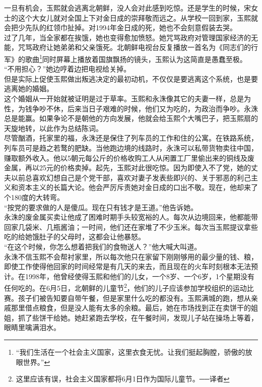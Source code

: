 \ifnum{}
	\begin{multicols}{\theparacolNo}
\fi
一旦有机会，玉熙就会逃离北朝鲜，没人会对此感到吃惊。还是学生的时候，宋女士的这个大女儿就对全国上下对金日成的崇拜敬而远之。从学校一回到家，玉熙就会把少先队的红领巾扯掉。对1994年金日成的死，她也不会刻意假装去哭。\\

过了几年，当全家都在挨饿，她也变得愈加愤怒。她咒骂政府对管理国家经济的无能，咒骂政府让她弟弟和父亲饿死。北朝鲜电视台反复播放一首名为《同志们的行军》的歌曲\footnote{“我们生活在一个社会主义国家，这里衣食无忧。让我们挺起胸膛，骄傲的放眼世界。”}同时屏幕上播放着国旗飘扬的镜头，玉熙认为这简直是愚蠢至极。\\

“不用担心？”她边哼着边把电视给关掉。\\

但是实际上促使玉熙做出叛逃决定的最初动机，不仅仅是要逃离这个系统，也是要逃离她的婚姻。\\

这个婚姻从一开始就被证明是过于草率。玉熙和永洙像其它的夫妻一样，总是为性，为钱争吵不休，后来当日子艰难的时候，他们又为吃的，为政治而争吵。永洙总是能赢。如果争论不是朝他的方向发展，他就会给玉熙个大嘴巴子，把玉熙扇的天旋地转，以此作为总结陈词。\\

尽管酗酒，托家里的福，永洙还是保住了列车员的工作和住的公寓。在铁路系统，列车员可是趋之若鹜的肥缺。当他跑边境的线路时，永洙可以私带货物卖往中国，赚取额外收入。他以5朝元每公斤的价格收购工人从闲置工厂里偷出来的铜线及废金属，再以25元的价格卖掉。起先，玉熙对此很吃惊。因为即使入不了党，她的丈夫以前总喜欢幻想自己是个党干部，喜欢对妻子发表些即兴的、关于邪恶的利己主义和资本主义的长篇大论。他会严厉斥责她对金日成的口出不敬。现在，他却来了个180度的大转弯。\\

“按党的要求做的人是傻瓜。现在只有钱才是王道。”他告诉她。\\

永洙的废金属买卖让他成了困难时期手头较宽裕的人。每次从边境回来，他都能带回家几袋米、几瓶酱油；一时间，他们还在家堆了不少玉米。每次当玉熙提议拿些吃的给她饿肚子的父母时，这都会让他暴怒。\\

“在这个时候，你怎么想着把我们的食物送人？”他大喊大叫道。\\

永洙不信玉熙不会帮衬家里，所以每次他只在家留下刚刚够用的最少量的钱、粮，即使工作使得他回家的时间经常是有几天的来去，而且现在的火车时刻根本无法预计。在1998年，他曾经使得玉熙和他们的儿女，一个8岁、一个6岁，1个星期没有任何吃的。在6月5日，北朝鲜的儿童节\footnote{这里应该有误，社会主义国家都将6月1日作为国际儿童节。──译者}，他们的儿子应该参加学校组织的运动比赛。孩子们被告知要自带午餐，但是家里什么吃的都没有。玉熙满城的跑，想从亲戚那里借点粮食，但是没人能有太多的余粮。最后，她在市场找到正在卖饼干的姐姐，抓了些饼干给她。她赶紧跑去学校，在午餐时间，发现儿子站在操场上等着，眼睛里噙满泪水。\\


\end{multicols}

